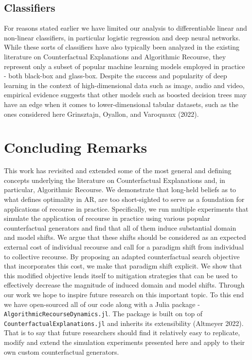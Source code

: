 \documentclass[conference,final,]{IEEEtran}
\begin{document}
\hypertarget{classifiers}{%
\subsection{Classifiers}\label{classifiers}}

For reasons stated earlier we have limited our analysis to differentiable linear and non-linear classifiers, in particular logistic regression and deep neural networks. While these sorts of classifiers have also typically been analyzed in the existing literature on Counterfactual Explanations and Algorithmic Recourse, they represent only a subset of popular machine learning models employed in practice - both black-box and glass-box. Despite the success and popularity of deep learning in the context of high-dimensional data such as image, audio and video, empirical evidence suggests that other models such as boosted decision trees may have an edge when it comes to lower-dimensional tabular datasets, such as the ones considered here Grinsztajn, Oyallon, and Varoquaux (2022).

\hypertarget{conclusion}{%
\section{Concluding Remarks}\label{conclusion}}

This work has revisited and extended some of the most general and defining concepts underlying the literature on Counterfactual Explanations and, in particular, Algorithmic Recourse. We demonstrate that long-held beliefs as to what defines optimality in AR, are too short-sighted to serve as a foundation for applications of recourse in practice. Specifically, we run multiple experiments that simulate the application of recourse in practice using various popular counterfactual generators and find that all of them induce substantial domain and model shifts. We argue that these shifts should be considered as an expected external cost of individual recourse and call for a paradigm shift from individual to collective recourse. By proposing an adapted counterfactual search objective that incorporates this cost, we make that paradigm shift explicit. We show that this modified objective lends itself to mitigation strategies that can be used to effectively decrease the magnitude of induced domain and model shifts. Through our work we hope to inspire future research on this important topic. To this end we have open-sourced all of our code along with a Julia package - \texttt{AlgorithmicRecourseDynamics.jl}. The package is built on top of \texttt{CounterfactualExplanations.jl} and inherits its extensibility (Altmeyer 2022). That is to say that future researchers should find it relatively easy to replicate, modify and extend the simulation experiments presented here and apply to their own custom counterfactual generators.
\end{document}
